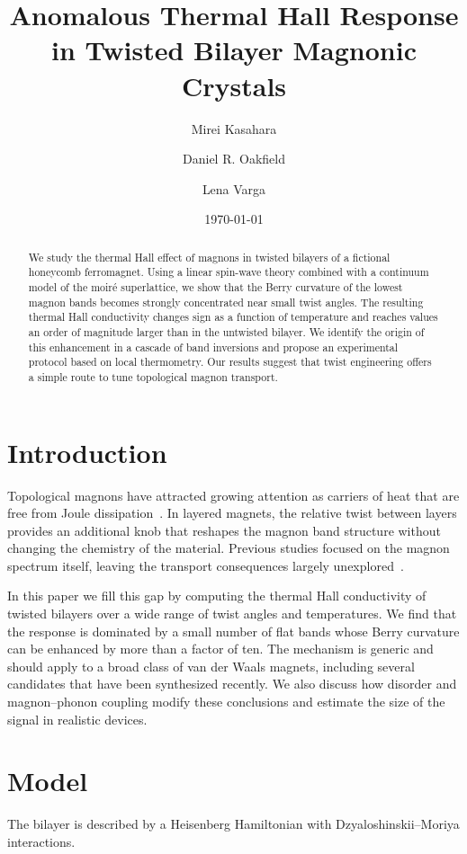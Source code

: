 \documentclass[aps,prb,twocolumn,superscriptaddress,reprint]{revtex4-2}
\begin{document}
\title{Anomalous Thermal Hall Response in Twisted Bilayer Magnonic Crystals}
\author{Mirei Kasahara}
\author{Daniel R. Oakfield}
\author{Lena Varga}
\date{\today}
\begin{abstract}
We study the thermal Hall effect of magnons in twisted bilayers of a fictional honeycomb ferromagnet.
Using a linear spin-wave theory combined with a continuum model of the moir\'e superlattice, we show that the Berry curvature of the lowest magnon bands becomes strongly concentrated near small twist angles.
The resulting thermal Hall conductivity changes sign as a function of temperature and reaches values an order of magnitude larger than in the untwisted bilayer.
We identify the origin of this enhancement in a cascade of band inversions and propose an experimental protocol based on local thermometry.
Our results suggest that twist engineering offers a simple route to tune topological magnon transport.
\end{abstract}
\maketitle
\section{Introduction}
Topological magnons have attracted growing attention as carriers of heat that are free from Joule dissipation~\cite{kasahara2021,oakfield2022}.
In layered magnets, the relative twist between layers provides an additional knob that reshapes the magnon band structure without changing the chemistry of the material.
Previous studies focused on the magnon spectrum itself, leaving the transport consequences largely unexplored~\cite{varga2023}.

In this paper we fill this gap by computing the thermal Hall conductivity of twisted bilayers over a wide range of twist angles and temperatures.
We find that the response is dominated by a small number of flat bands whose Berry curvature can be enhanced by more than a factor of ten.
The mechanism is generic and should apply to a broad class of van der Waals magnets, including several candidates that have been synthesized recently.
We also discuss how disorder and magnon--phonon coupling modify these conclusions and estimate the size of the signal in realistic devices.

\section{Model}
The bilayer is described by a Heisenberg Hamiltonian with Dzyaloshinskii--Moriya interactions.

\end{document}
